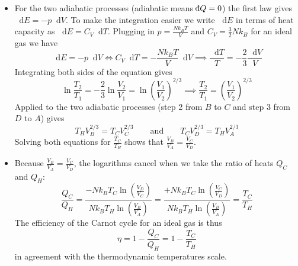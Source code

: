 \documentclass[11pt, a4paper]{article}
\newcommand{\diff}{\mathop{}\!\mathrm{d}} %
\newcommand{\dbar}{{\mathchar '26\mkern -11mu \mathrm{d}}} %
\begin{document}
\begin{itemize}
	\item For the two adiabatic processes (adiabatic means $ \dbar Q  = 0$) the first law gives $ \diff E = - p \diff V $. To make the integration easier we write $ \diff E $ in terms of heat capacity as $ \diff E = C_{V} \diff T $. Plugging in $ p = \frac{Nk_{B}T}{V} $ and $ C_{V} = \frac{3}{2}Nk_{B} $ for an ideal gas we have 
	\begin{equation*}
		\diff E = - p \diff V \iff C_{V} \diff T = - \frac{Nk_{B}T}{V} \diff V \implies \frac{\diff T}{T} = -\frac{2}{3}  \frac{\diff V}{V}
	\end{equation*}
	Integrating both sides of the equation gives
	\begin{equation*}
		\ln \frac{T_{2}}{T_{1}} = - \frac{2}{3} \ln \frac{V_{2}}{V_{1}} = \ln \left(\frac{V_{1}}{V_{2}}\right)^{2/3} \implies \frac{T_{2}}{T_{1}} = \left(\frac{V_{1}}{V_{2}}\right)^{2/3}
	\end{equation*}
	Applied to the two adiabatic processes (step 2 from $ B $ to $ C $ and step 3 from $ D $ to $ A $) gives
	\begin{equation*}
		T_{H}V_{B}^{2/3} = T_{C}V_{C}^{2/3} \qquad \text{and} \qquad T_{C}V_{D}^{2/3} = T_{H}V_{A}^{2/3}
	\end{equation*}
	Solving both equations for $ \frac{T_{C}}{T_{H}} $ shows that $\frac{V_{B}}{V_{A}} = \frac{V_{C}}{V_{D}}$. 
	
	\item Because $ \frac{V_{B}}{V_{A}} = \frac{V_{C}}{V_{D}} $, the logarithms cancel when we take the ratio of heats $ Q_{C} $ and $ Q_{H} $:
	\begin{equation*}
		\frac{Q_{C}}{Q_{H}} = \frac{- N k_{B} T_{C} \ln(\frac{V_{D}}{V_{C}})}{N k_{B} T_{H} \ln(\frac{V_{B}}{V_{A}})} =  \frac{+ N k_{B} T_{C} \ln(\frac{V_{C}}{V_{D}})}{N k_{B} T_{H} \ln(\frac{V_{B}}{V_{A}})} = \frac{T_{C}}{T_{H}}
	\end{equation*}
	The efficiency of the Carnot cycle for an ideal gas is thus
	\begin{equation*}
		\eta = 1 - \frac{Q_{C}}{Q_{H}} = 1 - \frac{T_{C}}{T_{H}}
	\end{equation*}
	in agreement with the thermodynamic temperatures scale.
	
\end{itemize}
\end{document}
